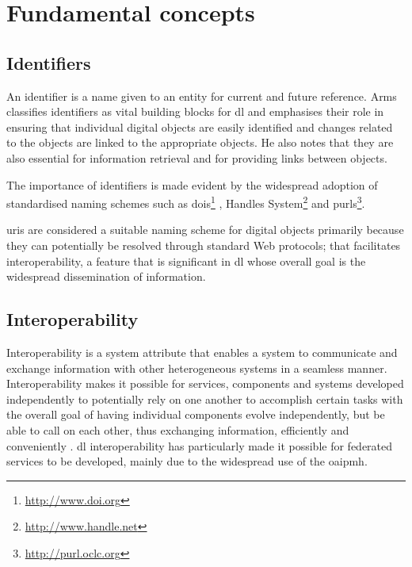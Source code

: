 \section{Fundamental concepts}
\label{sec:background:fundamental-concepts}

\subsection{Identifiers}
\label{sec:background:fundamental-concepts:identifiers}

An identifier is a name given to an entity for current and future reference. Arms \citep{Arms1995} classifies identifiers as vital building blocks for \gls{dl}  and emphasises their role in ensuring that individual digital objects are easily identified and changes related to the objects are linked to the appropriate objects. He also notes that they are also essential for information retrieval and for providing links between objects.

The importance of identifiers is made evident by the widespread adoption of standardised naming schemes such as \glspl{doi}\footnote{\url{http://www.doi.org}} \citep{Paskin2005,Paskin2010} , Handles System\footnote{\url{http://www.handle.net}} and \glspl{purl}\footnote{\url{http://purl.oclc.org}}.

\glspl{uri} \citep{RFC39862005} are considered a suitable naming scheme for digital objects primarily because they can potentially be resolved through standard Web protocols; that facilitates interoperability, a feature that is significant in \gls{dl}  whose overall goal is the widespread dissemination of information.

\subsection{Interoperability}
\label{sec:background:fundamental-concepts:interoperability}

Interoperability is a system attribute that enables a system to communicate and exchange information with other heterogeneous systems in a seamless manner. Interoperability makes it possible for services, components and systems developed independently to potentially rely on one another to accomplish certain tasks with the overall goal of having individual components evolve independently, but be able to call on each other, thus exchanging information, efficiently and conveniently \citep{Paepcke1998}⁠. \gls{dl} interoperability has particularly made it possible for federated services \citep{Goncalves2001} to be developed, mainly due to the widespread use of the \gls{oaipmh}.

